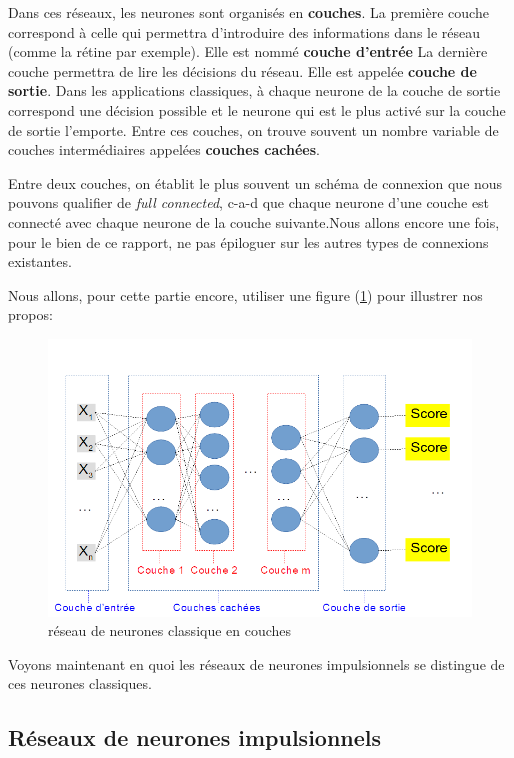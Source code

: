 Dans ces réseaux, les neurones sont organisés en \textbf{couches}.
La première couche correspond à celle qui permettra d'introduire des informations dans le réseau (comme la rétine par exemple). Elle est nommé \textbf{couche d'entrée}
La dernière couche permettra de lire les décisions du réseau. Elle est appelée \textbf{couche de sortie}. Dans les applications classiques, à chaque neurone de la couche de sortie correspond une décision possible et le neurone qui est le plus activé sur la couche de sortie l'emporte.
Entre ces couches, on trouve souvent un nombre variable de couches intermédiaires appelées \textbf{couches cachées}.

Entre deux couches, on établit le plus souvent un schéma de connexion que nous pouvons qualifier de \textit{full connected}, c-a-d que chaque neurone d'une couche est connecté avec chaque neurone de la couche suivante.Nous allons encore une fois, pour le bien de ce rapport, ne pas épiloguer sur les autres types de connexions existantes.\newline

Nous allons, pour cette partie encore, utiliser une figure (\ref{reseauClassique}) pour illustrer nos propos:

\begin{figure}[h]
\includegraphics[width=16.5cm]{./images/multicouche.png}
\caption{réseau de neurones classique en couches}
\label{reseauClassique}
\end{figure}

Voyons maintenant en quoi les réseaux de neurones impulsionnels se distingue de ces neurones classiques.

\subsection{Réseaux de neurones impulsionnels}
\label{SNN}


